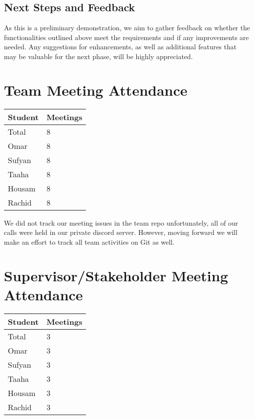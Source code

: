 \documentclass{article}
\begin{document}
\subsection{Next Steps and Feedback}

As this is a preliminary demonstration, we aim to gather feedback on whether the functionalities outlined above meet the requirements and if any improvements are needed. Any suggestions for enhancements, as well as additional features that may be valuable for the next phase, will be highly appreciated.


\section{Team Meeting Attendance}

\begin{table}[H]
\centering
\begin{tabular}{ll}
\toprule
\textbf{Student} & \textbf{Meetings}\\
\midrule
Total & 8\\
Omar & 8\\
Sufyan & 8\\
Taaha & 8\\
Housam & 8\\
Rachid & 8\\
\bottomrule
\end{tabular}
\end{table}

We did not track our meeting issues in the team repo unfortunately, all of our calls were held in our private discord server. However, moving forward we will make an effort to track all team activities on Git as well. 

\section{Supervisor/Stakeholder Meeting Attendance}

\begin{table}[H]
\centering
\begin{tabular}{ll}
\toprule
\textbf{Student} & \textbf{Meetings}\\
\midrule
Total & 3\\
Omar & 3\\
Sufyan & 3\\
Taaha & 3\\
Housam & 3\\
Rachid & 3\\
\end{tabular}
\end{table}
\end{document}
